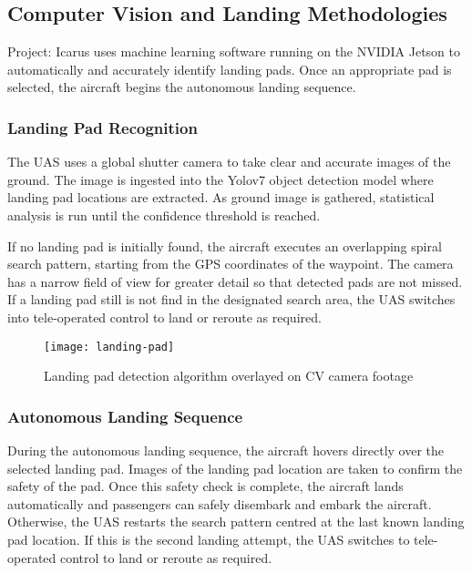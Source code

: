 \subsection{Computer Vision and Landing Methodologies}
\label{sec:cv-and-landing}

Project: Icarus uses machine learning software running on the NVIDIA Jetson to
automatically and accurately identify landing pads. Once an appropriate pad is
selected, the aircraft begins the autonomous landing sequence.

\subsubsection{Landing Pad Recognition}

The UAS uses a global shutter camera to take clear and accurate images of the
ground. The image is ingested into the Yolov7 object detection model where
landing pad locations are extracted. As ground image is gathered, statistical
analysis is run until the confidence threshold is reached.

If no landing pad is initially found, the aircraft executes an overlapping
spiral search pattern, starting from the GPS coordinates of the waypoint. The
camera has a narrow field of view for greater detail so that detected pads are
not missed. If a landing pad still is not find in the designated search area,
the UAS switches into tele-operated control to land or reroute as required.

\begin{figure}[H]
        \centering
        \texttt{[image: landing-pad]}
		\caption{Landing pad detection algorithm overlayed on CV camera
		footage}
\end{figure}

\subsubsection{Autonomous Landing Sequence}
\label{sec:landing-sequence}

During the autonomous landing sequence, the aircraft hovers directly over the
selected landing pad. Images of the landing pad location are taken to confirm
the safety of the pad. Once this safety check is complete, the aircraft lands
automatically and passengers can safely disembark and embark the aircraft.
Otherwise, the UAS restarts the search pattern centred at the last known
landing pad location. If this is the second landing attempt, the UAS switches
to tele-operated control to land or reroute as required.

